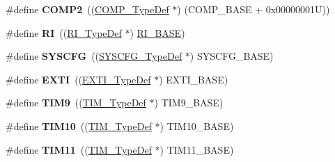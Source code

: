 \begin{DoxyCompactItemize}
\item 
\hypertarget{group___peripheral__declaration_ga6985fa7e9bb3c2edf15b29b7af210a2b}{\#define {\bfseries C\-O\-M\-P2}~((\hyperlink{struct_c_o_m_p___type_def}{C\-O\-M\-P\-\_\-\-Type\-Def} $\ast$) (C\-O\-M\-P\-\_\-\-B\-A\-S\-E + 0x00000001\-U))}\label{group___peripheral__declaration_ga6985fa7e9bb3c2edf15b29b7af210a2b}

\item 
\hypertarget{group___peripheral__declaration_ga7e71def3baefc10ec36f1dd48da4050e}{\#define {\bfseries R\-I}~((\hyperlink{struct_r_i___type_def}{R\-I\-\_\-\-Type\-Def} $\ast$) \hyperlink{group___peripheral__memory__map_ga8fdc749e6f184b3cd9b01f179af62e4c}{R\-I\-\_\-\-B\-A\-S\-E})}\label{group___peripheral__declaration_ga7e71def3baefc10ec36f1dd48da4050e}

\item 
\hypertarget{group___peripheral__declaration_ga3c833fe1c486cb62250ccbca32899cb8}{\#define {\bfseries S\-Y\-S\-C\-F\-G}~((\hyperlink{struct_s_y_s_c_f_g___type_def}{S\-Y\-S\-C\-F\-G\-\_\-\-Type\-Def} $\ast$) S\-Y\-S\-C\-F\-G\-\_\-\-B\-A\-S\-E)}\label{group___peripheral__declaration_ga3c833fe1c486cb62250ccbca32899cb8}

\item 
\hypertarget{group___peripheral__declaration_ga9189e770cd9b63dadd36683eb9843cac}{\#define {\bfseries E\-X\-T\-I}~((\hyperlink{struct_e_x_t_i___type_def}{E\-X\-T\-I\-\_\-\-Type\-Def} $\ast$) E\-X\-T\-I\-\_\-\-B\-A\-S\-E)}\label{group___peripheral__declaration_ga9189e770cd9b63dadd36683eb9843cac}

\item 
\hypertarget{group___peripheral__declaration_gaf52b4b4c36110a0addfa98059f54a50e}{\#define {\bfseries T\-I\-M9}~((\hyperlink{struct_t_i_m___type_def}{T\-I\-M\-\_\-\-Type\-Def} $\ast$) T\-I\-M9\-\_\-\-B\-A\-S\-E)}\label{group___peripheral__declaration_gaf52b4b4c36110a0addfa98059f54a50e}

\item 
\hypertarget{group___peripheral__declaration_ga46b2ad3f5f506f0f8df0d2ec3e767267}{\#define {\bfseries T\-I\-M10}~((\hyperlink{struct_t_i_m___type_def}{T\-I\-M\-\_\-\-Type\-Def} $\ast$) T\-I\-M10\-\_\-\-B\-A\-S\-E)}\label{group___peripheral__declaration_ga46b2ad3f5f506f0f8df0d2ec3e767267}

\item 
\hypertarget{group___peripheral__declaration_gacfd11ef966c7165f57e2cebe0abc71ad}{\#define {\bfseries T\-I\-M11}~((\hyperlink{struct_t_i_m___type_def}{T\-I\-M\-\_\-\-Type\-Def} $\ast$) T\-I\-M11\-\_\-\-B\-A\-S\-E)}\label{group___peripheral__declaration_gacfd11ef966c7165f57e2cebe0abc71ad}


\end{DoxyCompactItemize}
